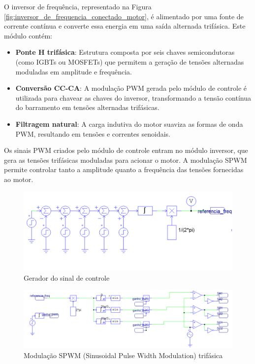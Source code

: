 \documentclass[a4paper, 11pt]{article}
\begin{document}
O inversor de frequência, representado na Figura \ref{fig:inversor_de_frequencia_conectado_motor}, é alimentado por uma fonte de corrente contínua e converte essa energia em uma saída alternada trifásica. Este módulo contém:

\begin{itemize}
    \item \textbf{Ponte H trifásica}: Estrutura composta por seis chaves semicondutoras (como IGBTs ou MOSFETs) que permitem a geração de tensões alternadas moduladas em amplitude e frequência.
    \item \textbf{Conversão CC-CA}: A modulação PWM gerada pelo módulo de controle é utilizada para chavear as chaves do inversor, transformando a tensão contínua do barramento em tensões alternadas trifásicas.
    \item \textbf{Filtragem natural}: A carga indutiva do motor suaviza as formas de onda PWM, resultando em tensões e correntes senoidais.
\end{itemize}
   
Os sinais PWM criados pelo módulo de controle entram no módulo inversor, que gera as tensões trifásicas moduladas para acionar o motor. A modulação SPWM permite controlar tanto a amplitude quanto a frequência das tensões fornecidas ao motor.

\begin{figure}[H]
    \centering
        \includegraphics[width=1\linewidth]{images/circuito_referencia.png}
    \caption{Gerador do sinal de controle}
    \label{circuito sinal controle}
\end{figure}
  
\begin{figure}[H]
    \centering
    \includegraphics[width=1\linewidth]{images/spwm_2.png}
    \caption{Modulação SPWM (Sinusoidal Pulse Width Modulation) trifásica}
    \label{fig:spwm}
\end{figure}
  
\end{document}
